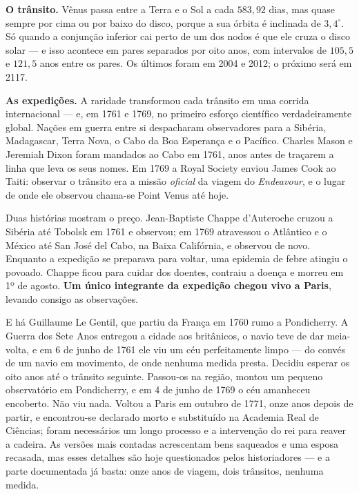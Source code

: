 \documentclass[11pt,a4paper]{article}
\begin{document}
\textbf{O trânsito.} Vênus passa entre a Terra e o Sol a cada $583{,}92$ dias, mas quase sempre por cima ou por baixo do disco, porque a sua órbita é inclinada de $3{,}4^\circ$. Só quando a conjunção inferior cai perto de um dos nodos é que ele cruza o disco solar --- e isso acontece em pares separados por oito anos, com intervalos de $105{,}5$ e $121{,}5$ anos entre os pares. Os últimos foram em 2004 e 2012; o próximo será em 2117.

\textbf{As expedições.} A raridade transformou cada trânsito em uma corrida internacional --- e, em 1761 e 1769, no primeiro esforço científico verdadeiramente global. Nações em guerra entre si despacharam observadores para a Sibéria, Madagascar, Terra Nova, o Cabo da Boa Esperança e o Pacífico. Charles Mason e Jeremiah Dixon foram mandados ao Cabo em 1761, anos antes de traçarem a linha que leva os seus nomes. Em 1769 a Royal Society enviou James Cook ao Taiti: observar o trânsito era a missão \emph{oficial} da viagem do \textit{Endeavour}, e o lugar de onde ele observou chama-se Point Venus até hoje.

Duas histórias mostram o preço. Jean-Baptiste Chappe d'Auteroche cruzou a Sibéria até Tobolsk em 1761 e observou; em 1769 atravessou o Atlântico e o México até San José del Cabo, na Baixa Califórnia, e observou de novo. Enquanto a expedição se preparava para voltar, uma epidemia de febre atingiu o povoado. Chappe ficou para cuidar dos doentes, contraiu a doença e morreu em 1º de agosto. \textbf{Um único integrante da expedição chegou vivo a Paris}, levando consigo as observações.

E há Guillaume Le Gentil, que partiu da França em 1760 rumo a Pondicherry. A Guerra dos Sete Anos entregou a cidade aos britânicos, o navio teve de dar meia-volta, e em 6 de junho de 1761 ele viu um céu perfeitamente limpo --- do convés de um navio em movimento, de onde nenhuma medida presta. Decidiu esperar os oito anos até o trânsito seguinte. Passou-os na região, montou um pequeno observatório em Pondicherry, e em 4 de junho de 1769 o céu amanheceu encoberto. Não viu nada. Voltou a Paris em outubro de 1771, onze anos depois de partir, e encontrou-se declarado morto e substituído na Academia Real de Ciências; foram necessários um longo processo e a intervenção do rei para reaver a cadeira. As versões mais contadas acrescentam bens saqueados e uma esposa recasada, mas esses detalhes são hoje questionados pelos historiadores --- e a parte documentada já basta: onze anos de viagem, dois trânsitos, nenhuma medida.
\end{document}
